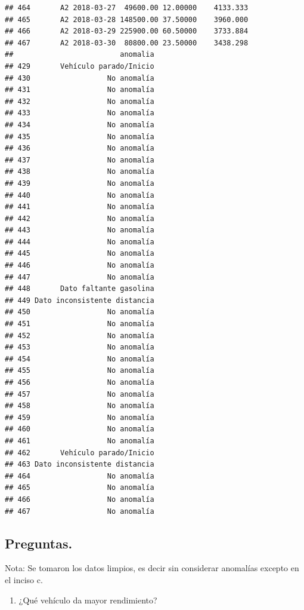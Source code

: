 \documentclass[]{article}
\newenvironment{Shaded}{\begin{snugshade}}{\end{snugshade}}
\newcommand{\KeywordTok}[1]{\textcolor[rgb]{0.13,0.29,0.53}{\textbf{#1}}}
\newcommand{\DataTypeTok}[1]{\textcolor[rgb]{0.13,0.29,0.53}{#1}}
\newcommand{\StringTok}[1]{\textcolor[rgb]{0.31,0.60,0.02}{#1}}
\newcommand{\CommentTok}[1]{\textcolor[rgb]{0.56,0.35,0.01}{\textit{#1}}}
\newcommand{\OperatorTok}[1]{\textcolor[rgb]{0.81,0.36,0.00}{\textbf{#1}}}
\newcommand{\NormalTok}[1]{#1}
\providecommand{\tightlist}{%
  \setlength{\itemsep}{0pt}\setlength{\parskip}{0pt}}
\begin{document}
\begin{verbatim}
## 464       A2 2018-03-27  49600.00 12.00000    4133.333
## 465       A2 2018-03-28 148500.00 37.50000    3960.000
## 466       A2 2018-03-29 225900.00 60.50000    3733.884
## 467       A2 2018-03-30  80800.00 23.50000    3438.298
##                         anomalia
## 429       Vehículo parado/Inicio
## 430                  No anomalía
## 431                  No anomalía
## 432                  No anomalía
## 433                  No anomalía
## 434                  No anomalía
## 435                  No anomalía
## 436                  No anomalía
## 437                  No anomalía
## 438                  No anomalía
## 439                  No anomalía
## 440                  No anomalía
## 441                  No anomalía
## 442                  No anomalía
## 443                  No anomalía
## 444                  No anomalía
## 445                  No anomalía
## 446                  No anomalía
## 447                  No anomalía
## 448       Dato faltante gasolina
## 449 Dato inconsistente distancia
## 450                  No anomalía
## 451                  No anomalía
## 452                  No anomalía
## 453                  No anomalía
## 454                  No anomalía
## 455                  No anomalía
## 456                  No anomalía
## 457                  No anomalía
## 458                  No anomalía
## 459                  No anomalía
## 460                  No anomalía
## 461                  No anomalía
## 462       Vehículo parado/Inicio
## 463 Dato inconsistente distancia
## 464                  No anomalía
## 465                  No anomalía
## 466                  No anomalía
## 467                  No anomalía
\end{verbatim}

\subsection{Preguntas.}\label{preguntas.}

Nota: Se tomaron los datos limpios, es decir sin considerar anomalías
excepto en el inciso c.

\begin{enumerate}
\def\labelenumi{\alph{enumi}.}
\tightlist
\item
  ¿Qué vehículo da mayor rendimiento?
\end{enumerate}

\begin{Shaded}
\end{Shaded}
\end{document}
